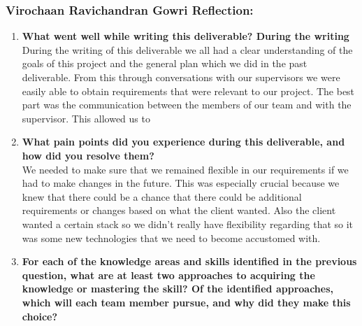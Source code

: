 \subsubsection*{Virochaan Ravichandran Gowri Reflection:}
\begin{enumerate}
  \item \textbf{What went well while writing this deliverable? 
  During the writing} \\
  During the writing of this deliverable we all had a clear understanding of the goals of this project and the general plan which we did in the past deliverable. From this through conversations with our supervisors we were easily able to obtain requirements that were relevant to our project. The best part was the communication between the members of our team and with the supervisor. This allowed us to 
  \item \textbf{What pain points did you experience during this deliverable, and how did you resolve them?} \\
  We needed to make sure that we remained flexible in our requirements if we had to make changes in the future. This was especially crucial because we knew that there could be a chance that there could be additional requirements or changes based on what the client wanted. Also the client wanted a certain stack so we didn't really have flexibility regarding that so it was some new technologies that we need to become accustomed with. 
  \item \textbf{For each of the knowledge areas and skills identified in the previous question, what are at least two approaches to acquiring the knowledge or mastering the skill?  Of the identified approaches, which will each team member pursue, and why did they make this choice?}
\end{enumerate}

